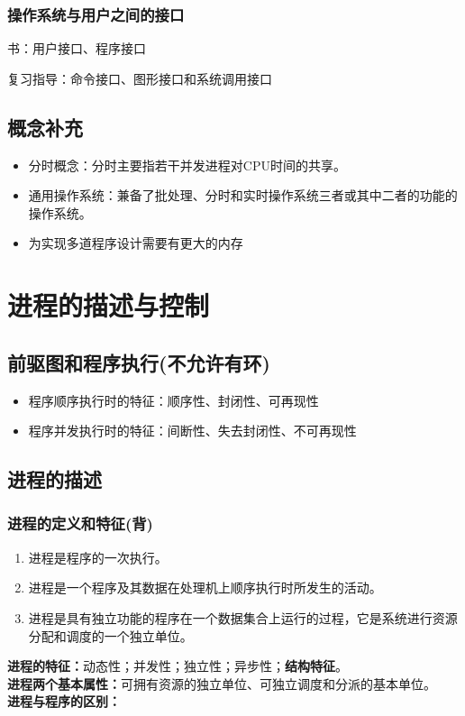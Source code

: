 \documentclass{article}
\begin{document}
\subsubsection{\color{red}操作系统与用户之间的接口}
书：用户接口、程序接口

复习指导：命令接口、图形接口和系统调用接口

\subsection{\color{red}概念补充}
\begin{itemize}
    \item 分时概念：分时主要指若干并发进程对CPU时间的共享。
    \item 通用操作系统：兼备了批处理、分时和实时操作系统三者或其中二者的功能的操作系统。
    \item 为实现多道程序设计需要有更大的内存
\end{itemize}



\clearpage
\section{进程的描述与控制}
\subsection{前驱图和程序执行(不允许有环)}
\begin{itemize}
    \item 程序顺序执行时的特征：顺序性、封闭性、可再现性
    \item 程序并发执行时的特征：间断性、失去封闭性、不可再现性
\end{itemize}

\subsection{进程的描述}
\subsubsection{{\color{red}进程的定义和特征{\color{green}(背)}}}
\begin{enumerate}
    \item 进程是程序的一次执行。
    \item 进程是一个程序及其数据在处理机上顺序执行时所发生的活动。
    \item 进程是具有独立功能的程序在一个数据集合上运行的过程，它是系统进行资源分配和调度的一个独立单位。
\end{enumerate}
\textbf{进程的特征：}动态性；并发性；独立性；异步性；\textbf{结构特征}。\\
\textbf{进程两个基本属性：}可拥有资源的独立单位、可独立调度和分派的基本单位。\\
\textbf{进程与程序的区别：}
\end{document}
